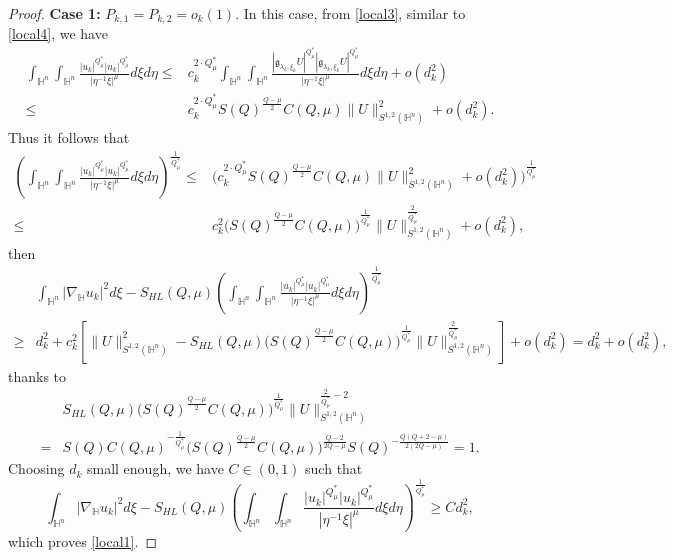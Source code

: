 \documentclass[11pt]{article}
\begin{document}
\begin{proof}
\textbf{Case 1:} $P_{k,1}=P_{k,2}=o_k(1)$. In this case, from \eqref{local3},
similar to \eqref{local4},
we have
\begin{align*}%
    \int_{\mathbb{H}^{n}}\int_{\mathbb{H}^{n}}\frac{|u_k|^{Q^{\ast}_{\mu}}|u_k|
^{Q^{\ast}_{\mu}}}{|\eta^{-1}\xi|^{\mu}}{d}\xi{d}\eta
  \leq &c_k^{2\cdot Q_{\mu}^{\ast}} \int_{\mathbb{H}^{n}}\int_{\mathbb{H}^{n}}\frac{|\mathfrak{g}_{\lambda_k,\xi_k}U|^{Q^{\ast}_{\mu}}|\mathfrak{g}_{\lambda_k,\xi_k}U|
^{Q^{\ast}_{\mu}}}{|\eta^{-1}\xi|^{\mu}}{d}\xi{d}\eta+ o(d_k^2) \nonumber\\
\leq& c_k^{2\cdot Q_{\mu}^{\ast}} S(Q)^{\frac{Q-\mu}{2}}C(Q,\mu)\|U\|^2_{S^{1,2}(\mathbb{H}^{n})}+o(d_k^2).
    \end{align*}
    Thus it follows that
    \begin{align*}
      \left(\int_{\mathbb{H}^{n}}\int_{\mathbb{H}^{n}}\frac{|u_k|^{Q^{\ast}_{\mu}}|u_k|
^{Q^{\ast}_{\mu}}}{|\eta^{-1}\xi|^{\mu}}{d}\xi{d}\eta\right)^{\frac{1}{Q_\mu^*}}\leq& \bigg(c_k^{2\cdot Q_{\mu}^{\ast}}  S(Q)^{\frac{Q-\mu}{2}}C(Q,\mu) \|U\|^2_{S^{1,2}(\mathbb{H}^{n})}+o(d_k^2)\bigg)^{\frac{1}{Q_\mu^*}}\\
\leq& c_k^{2} \Big( S(Q)^{\frac{Q-\mu}{2}}C(Q,\mu) \Big)^{\frac{1}{Q_\mu^*}}\|U\|^{\frac{2}{Q_\mu^*}}_{S^{1,2}(\mathbb{H}^{n})}+o(d_k^2),
    \end{align*}
    then
    \begin{align*}
     & \int_{\mathbb{H}^{n}}|\nabla_{\mathbb{H}} u_k|^{2}{d}\xi-S_{HL}(Q,\mu)	\left(\int_{\mathbb{H}^{n}}\int_{\mathbb{H}^{n}}\frac{|u_k|^{Q^{\ast}_{\mu}}|u_k|
^{Q^{\ast}_{\mu}}}{|\eta^{-1}\xi|^{\mu}}{d}\xi{d}\eta\right)^{\frac{1}{Q^{\ast}_{\mu}}}\\
\geq&
d_k^2+c_k^2\left[\|U\|^2_{{S}^{1,2}(\mathbb{H}^n)}-S_{HL}(Q,\mu)\Big( S(Q)^{\frac{Q-\mu}{2}}C(Q,\mu) \Big)^{\frac{1}{Q_\mu^*}} \|U\|^{\frac{2}{Q_\mu^*}}_{S^{1,2}(\mathbb{H}^{n})}\right]+o(d_k^2)
=d_k^2+o(d_k^2),
    \end{align*}
    thanks to
    \begin{align*}
      &S_{HL}(Q,\mu)\big( S(Q)^{\frac{Q-\mu}{2}}C(Q,\mu) \big)^{\frac{1}{Q_\mu^*}} \|U\|^{\frac{2}{Q_\mu^*}-2}_{S^{1,2}(\mathbb{H}^{n})}\\
      =&
      S(Q)C(Q,\mu)^{-\frac{1}{Q_\mu^*}}
      \Big(S(Q)^{\frac{Q-\mu}{2}}C(Q,\mu)\Big)^{\frac{Q-2}{2Q-\mu}}
      S(Q)^{-\frac{Q(Q+2-\mu)}{2(2Q-\mu)}}=1.
    \end{align*}
    Choosing $d_k$ small enough, we have $C\in (0,1)$ such that
    \begin{equation*}
      \int_{\mathbb{H}^{n}}|\nabla_{\mathbb{H}} u_k|^{2}{d}\xi-S_{HL}(Q,\mu)	\left(\int_{\mathbb{H}^{n}}\int_{\mathbb{H}^{n}}\frac{|u_k|^{Q^{\ast}_{\mu}}|u_k|
^{Q^{\ast}_{\mu}}}{|\eta^{-1}\xi|^{\mu}}{d}\xi{d}\eta\right)^{\frac{1}{Q^{\ast}_{\mu}}}\geq Cd_k^2,
    \end{equation*}
    which proves \eqref{local1}.


\end{proof}
\end{document}
